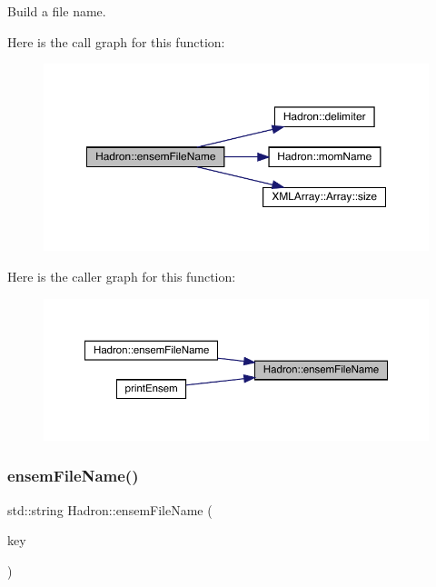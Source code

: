 Build a file name. 

Here is the call graph for this function\+:\nopagebreak
\begin{figure}[H]
\begin{center}
\leavevmode
\includegraphics[width=350pt]{d1/daf/namespaceHadron_ae52edd7538c484e9f1c59f65a1d010ca_cgraph}
\end{center}
\end{figure}
Here is the caller graph for this function\+:\nopagebreak
\begin{figure}[H]
\begin{center}
\leavevmode
\includegraphics[width=350pt]{d1/daf/namespaceHadron_ae52edd7538c484e9f1c59f65a1d010ca_icgraph}
\end{center}
\end{figure}
\mbox{\label{namespaceHadron_af97a705730e771598736c0ddcec48fea}} 
\subsubsection{\texorpdfstring{ensemFileName()}{ensemFileName()}\hspace{0.1cm}{\footnotesize\ttfamily [2/12]}}
{\footnotesize\ttfamily std\+::string Hadron\+::ensem\+File\+Name (\begin{DoxyParamCaption}\item[{const \mbox{\hyperlink{structFF_1_1KeyHadron1PtCorr__t}{F\+F\+::\+Key\+Hadron1\+Pt\+Corr\+\_\+t}} \&}]{key }\end{DoxyParamCaption})}



